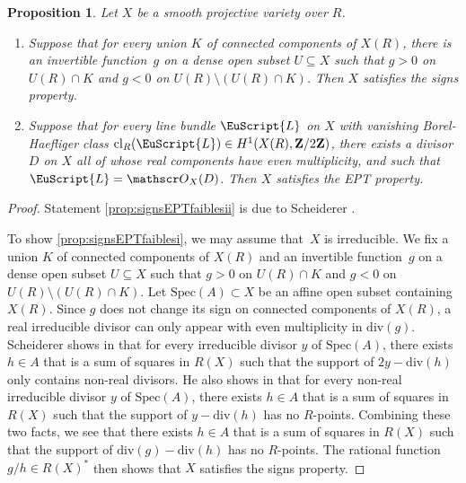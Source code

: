 \documentclass[JEP,XML,SOM,Unicode]{cedram}
\let\mathcal\EuScript
\theoremstyle{plain}
\newtheorem{prop}[thm]{Proposition}
\theoremstyle{definition}
\numberwithin{equation}{section}
\newcommand{\cl}{{\mathrm{cl}}}
\newcommand{\sO}{{\mathscr O}}
\newcommand{\Z}{{\mathbf Z}}
\newcommand{\Spec}{\mathrm{Spec}}
\newcommand{\divi}{\mathrm{div}}
\begin{document}
\pagebreak[2]
\begin{prop}
\label{prop:signsEPTfaibles}
Let $X$ be a smooth projective variety over $R$.
\begin{enumerate}
\item\label{prop:signsEPTfaiblesi} Suppose that for every union $K$ of connected components of $X(R)$, there is an invertible
function~$g$ on a dense
open subset $U \subseteq X$
such that $g>0$ on $U(R)\cap K$ and $g<0$ on $U(R) \setminus (U(R)\cap K)$.
Then $X$ satisfies the signs property.
\item\label{prop:signsEPTfaiblesii} Suppose that for every line bundle $\mathcal{L}$ on $X$ with vanishing Borel-Haefliger class $\cl_R(\mathcal{L})\in H^1(X(R),\Z/2\Z)$, there exists a divisor $D$ on $X$ all of whose real components have even multiplicity, and such that $\mathcal{L}=\sO_X(D)$. Then $X$ satisfies the EPT property.
\end{enumerate}
\end{prop}

\begin{proof}
Statement \eqref{prop:signsEPTfaiblesii} is due to Scheiderer \cite[App., Prop.]{scheidererpurity}.

To show \eqref{prop:signsEPTfaiblesi}, we may assume that~$X$ is irreducible. We fix a union $K$ of connected components of $X(R)$ and an invertible function~$g$ on a dense open subset $U \subseteq X$
such that $g>0$ on $U(R) \cap K$ and $g<0$ on $U(R) \setminus (U(R) \cap K)$. Let $\Spec(A)\subset X$ be an affine open subset containing $X(R)$.
Since $g$ does not change its sign on connected components of $X(R)$, a real irreducible divisor can only appear with even multiplicity in $\divi(g)$. Scheiderer shows in \cite[App., Proof of Lem.\,2]{scheidererpurity} that for every irreducible divisor $y$ of $\Spec(A)$, there exists $h\in A$ that is a sum of squares in $R(X)$ such that the support of $2y-\divi(h)$ only contains non-real divisors. He also shows in \cite[App., Proof of Lem.\,1]{scheidererpurity} that for every non-real irreducible divisor $y$ of $\Spec(A)$, there exists $h\in A$ that is a sum of squares in $R(X)$ such that the support of $y-\divi(h)$ has no $R$-points. Combining these two facts, we see that there exists $h\in A$ that is a sum of squares in $R(X)$ such that the support of $\divi(g)-\divi(h)$ has no $R$-points. The rational function $g/h \in R(X)^*$ then shows that $X$ satisfies the signs property.
\end{proof}
\end{document}
